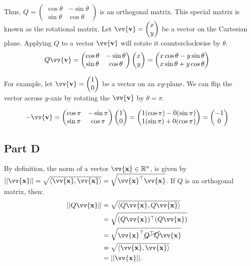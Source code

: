 \documentclass[12pt]{article}
\newcommand{\vect}[1]{\vv{\mathbf{#1}}}
\newcommand{\R}{\mathbb{R}}
\begin{document}
Thus, $Q = \begin{pmatrix}
    \cos\theta & -\sin\theta \\
    \sin\theta & \cos\theta
\end{pmatrix}$ is an orthogonal matrix. This special matrix is known as the rotational matrix. Let $\vect{v}=\begin{pmatrix}
    x \\ y
\end{pmatrix}$ be a vector on the Cartesian plane. Applying $Q$ to a vector $\vect{v}$ will rotate it counterclockwise by $\theta$.
$$
Q\vect{v} = \begin{pmatrix}
    \cos\theta & -\sin\theta \\
    \sin\theta & \cos\theta
\end{pmatrix}
\begin{pmatrix}
    x \\ y
\end{pmatrix}
= \begin{pmatrix}
    x\cos\theta - y\sin\theta \\
    x\sin\theta + y\cos\theta
\end{pmatrix}
$$

For example, let $\vect{v}=\begin{pmatrix}
    1 \\ 0
\end{pmatrix}$ be a vector on an $xy$-plane. We can flip the vector across $y$-axis by rotating the $\vect{v}$ by $\theta=\pi$.

$$
-\vect{v}
= \begin{pmatrix}
    \cos\pi & -\sin\pi \\
    \sin\pi & \cos\pi
\end{pmatrix}
\begin{pmatrix}
    1 \\ 0
\end{pmatrix}
= \begin{pmatrix}
    1(\cos\pi) - 0(\sin\pi) \\
    1(\sin\pi) + 0(\cos\pi)
\end{pmatrix}
= \begin{pmatrix}
    -1 \\ 0
\end{pmatrix}
$$

\subsection*{Part D}

By definition, the norm of a vector $\vect{x}\in\R^n$, is given by $||\vect{x}|| = \sqrt{\langle\vect{x},\vect{x}\rangle} = \sqrt{\vect{x}^\top \vect{x}}$. If $Q$ is an orthogonal matrix, then:
\begin{align*}
    ||Q\vect{x}|| &= \sqrt{\langle Q\vect{x}, Q\vect{x}\rangle} \\
    &= \sqrt{(Q\vect{x})^\top (Q\vect{x})} \\
    &= \sqrt{\vect{x}^\top \cancel{Q^\top Q}\vect{x}} \\
    &= \sqrt{\langle\vect{x},\vect{x}\rangle} \\
    &= ||\vect{x}||.
\end{align*}
\end{document}
